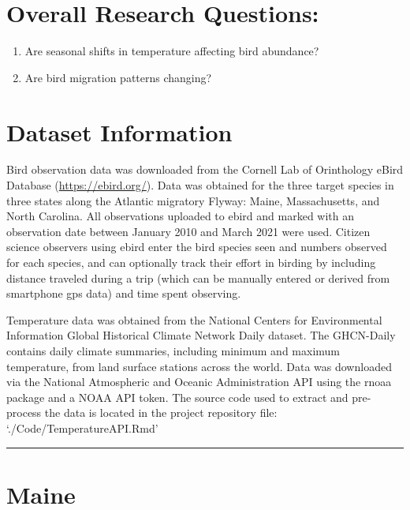 \documentclass[
  12pt,
]{article}
\providecommand{\tightlist}{%
  \setlength{\itemsep}{0pt}\setlength{\parskip}{0pt}}
\begin{document}
\hypertarget{overall-research-questions}{%
\section{Overall Research Questions:}\label{overall-research-questions}}

\begin{enumerate}
\def\labelenumi{\arabic{enumi}.}
\tightlist
\item
  Are seasonal shifts in temperature affecting bird abundance?
\item
  Are bird migration patterns changing?
\end{enumerate}

\newpage

\hypertarget{dataset-information}{%
\section{Dataset Information}\label{dataset-information}}

Bird observation data was downloaded from the Cornell Lab of Orinthology
eBird Database (\url{https://ebird.org/}). Data was obtained for the
three target species in three states along the Atlantic migratory
Flyway: Maine, Massachusetts, and North Carolina. All observations
uploaded to ebird and marked with an observation date between January
2010 and March 2021 were used. Citizen science observers using ebird
enter the bird species seen and numbers observed for each species, and
can optionally track their effort in birding by including distance
traveled during a trip (which can be manually entered or derived from
smartphone gps data) and time spent observing.

Temperature data was obtained from the National Centers for
Environmental Information Global Historical Climate Network Daily
dataset. The GHCN-Daily contains daily climate summaries, including
minimum and maximum temperature, from land surface stations across the
world. Data was downloaded via the National Atmospheric and Oceanic
Administration API using the rnoaa package and a NOAA API token. The
source code used to extract and pre-process the data is located in the
project repository file: `./Code/TemperatureAPI.Rmd'

\newpage

\begin{center}\rule{0.5\linewidth}{0.5pt}\end{center}

\hypertarget{maine}{%
\section{Maine}\label{maine}}
\end{document}
